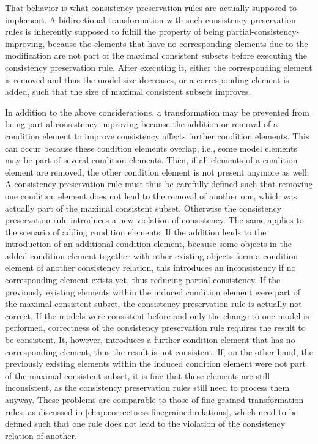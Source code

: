 That behavior is what consistency preservation rules are actually supposed to implement.
A bidirectional transformation with such consistency preservation rules is inherently supposed to fulfill the property of being partial-consistency-improving, because the elements that have no corresponding elements due to the modification are not part of the maximal consistent subsets before executing the consistency preservation rule.
After executing it, either the corresponding element is removed and thus the model size decreases, or a corresponding element is added, such that the size of maximal consistent subsets improves.

In addition to the above considerations, a transformation may be prevented from being partial-consistency-improving because the addition or removal of a condition element to improve consistency affects further condition elements.
This can occur because these condition elements overlap, i.e., some model elements may be part of several condition elements.
Then, if all elements of a condition element are removed, the other condition element is not present anymore as well.
A consistency preservation rule must thus be carefully defined such that removing one condition element does not lead to the removal of another one, which was actually part of the maximal consistent subset.
Otherwise the consistency preservation rule introduces a new violation of consistency.
The same applies to the scenario of adding condition elements. 
If the addition leads to the introduction of an additional condition element, because some objects in the added condition element together with other existing objects form a condition element of another consistency relation, this introduces an inconsistency if no corresponding element exists yet, thus reducing partial consistency.
If the previously existing elements within the induced condition element were part of the maximal consistent subset, the consistency preservation rule is actually not correct.
If the models were consistent before and only the change to one model is performed, correctness of the consistency preservation rule requires the result to be consistent.
It, however, introduces a further condition element that has no corresponding element, thus the result is not consistent.
If, on the other hand, the previously existing elements within the induced condition element were not part of the maximal consistent subset, it is fine that these elements are still inconsistent, as the consistency preservation rules still need to process them anyway.
These problems are comparable to those of fine-grained transformation rules, as discussed in \autoref{chap:correctness:finegrained:relations}, which need to be defined such that one rule does not lead to the violation of the consistency relation of another.

